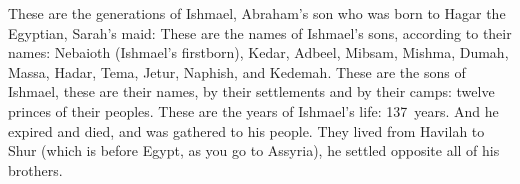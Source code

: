 \begin{inparaenum}
     These are the generations of Ishmael, Abraham's son who was born to Hagar the Egyptian, Sarah's maid:%
     These are the names of Ishmael's sons, according to their names: Nebaioth (Ishmael's firstborn), Kedar, Adbeel, Mibsam,%
     Mishma, Dumah, Massa,%
     Hadar, Tema, Jetur, Naphish, and Kedemah.%
     These are the sons of Ishmael, these are their names, by their settlements and by their camps: twelve princes of their peoples.%
     These are the years of Ishmael's life: 137~years. And he expired and died, and was gathered to his people.%
     They lived from Havilah to Shur (which is before Egypt, as you go to Assyria), he settled opposite all of his brothers.%
    
     \smallskip%
    
    \pvdb{}{}%
    
    \pvdb{}{}%
    
\end{inparaenum}
